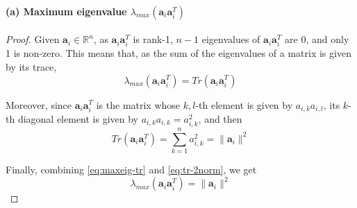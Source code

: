 \documentclass[12pt]{article}
\newcommand{\aat}{\mathbf{a}_{i} \mathbf{a}_{i}^{T}}
\begin{document}
\paragraph{(a) Maximum eigenvalue \texorpdfstring{$\lambda_{max}(\aat)$}{Lg}} \label{par:max-eig}
\begin{proof}
Given $\mathbf{a}_i \in \mathbb{R}^{n}$, as $\aat$ is rank-1, $n-1$ eigenvalues of $\aat$ are $0$, and only 1 is non-zero. This means that, as the sum of the eigenvalues of a matrix is given by its trace,
\begin{equation} \label{eq:maxeig-tr}
    \lambda_{max}(\aat) = Tr(\aat)
\end{equation}

Moreover, since $\aat$ is the matrix whose $k,l$-th element is given by $a_{i,k}a_{i,l}$, its $k$-th diagonal element is given by $a_{i,k}a_{i,k} = a_{i,k}^{2}$, and then
\begin{equation} \label{eq:tr-2norm}
    Tr(\aat) = \sum_{k=1}^{n} a_{i,k}^{2} = \lVert \mathbf{a}_{i} \rVert ^{2}
\end{equation}

Finally, combining \eqref{eq:maxeig-tr} and \eqref{eq:tr-2norm}, we get
\begin{equation}
    \lambda_{max}(\aat) = \lVert \mathbf{a}_{i} \rVert ^{2}
\end{equation}

\end{proof}
\end{document}
